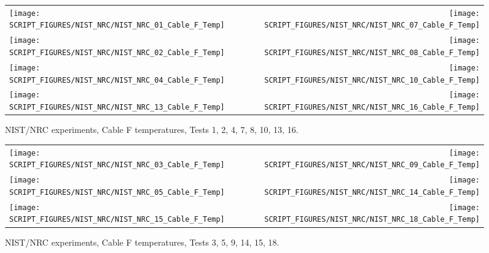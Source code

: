 \begin{figure}[p]
\begin{tabular*}{\textwidth}{l@{\extracolsep{\fill}}r}
\texttt{[image: SCRIPT\_FIGURES/NIST\_NRC/NIST\_NRC\_01\_Cable\_F\_Temp]} &
\texttt{[image: SCRIPT\_FIGURES/NIST\_NRC/NIST\_NRC\_07\_Cable\_F\_Temp]} \\
\texttt{[image: SCRIPT\_FIGURES/NIST\_NRC/NIST\_NRC\_02\_Cable\_F\_Temp]} &
\texttt{[image: SCRIPT\_FIGURES/NIST\_NRC/NIST\_NRC\_08\_Cable\_F\_Temp]} \\
\texttt{[image: SCRIPT\_FIGURES/NIST\_NRC/NIST\_NRC\_04\_Cable\_F\_Temp]} &
\texttt{[image: SCRIPT\_FIGURES/NIST\_NRC/NIST\_NRC\_10\_Cable\_F\_Temp]} \\
\texttt{[image: SCRIPT\_FIGURES/NIST\_NRC/NIST\_NRC\_13\_Cable\_F\_Temp]} &
\texttt{[image: SCRIPT\_FIGURES/NIST\_NRC/NIST\_NRC\_16\_Cable\_F\_Temp]}
\end{tabular*}
\caption{NIST/NRC experiments, Cable F temperatures, Tests 1, 2, 4, 7, 8, 10, 13, 16.}
\label{NIST_NRC_Cable_F_Closed}
\end{figure}

\begin{figure}[p]
\begin{tabular*}{\textwidth}{l@{\extracolsep{\fill}}r}
\texttt{[image: SCRIPT\_FIGURES/NIST\_NRC/NIST\_NRC\_03\_Cable\_F\_Temp]} &
\texttt{[image: SCRIPT\_FIGURES/NIST\_NRC/NIST\_NRC\_09\_Cable\_F\_Temp]} \\
\texttt{[image: SCRIPT\_FIGURES/NIST\_NRC/NIST\_NRC\_05\_Cable\_F\_Temp]} &
\texttt{[image: SCRIPT\_FIGURES/NIST\_NRC/NIST\_NRC\_14\_Cable\_F\_Temp]} \\
\texttt{[image: SCRIPT\_FIGURES/NIST\_NRC/NIST\_NRC\_15\_Cable\_F\_Temp]} &
\texttt{[image: SCRIPT\_FIGURES/NIST\_NRC/NIST\_NRC\_18\_Cable\_F\_Temp]}
\end{tabular*}
\caption{NIST/NRC experiments, Cable F temperatures, Tests 3, 5, 9, 14, 15, 18.}
\label{NIST_NRC_Cable_F_Open}
\end{figure}

